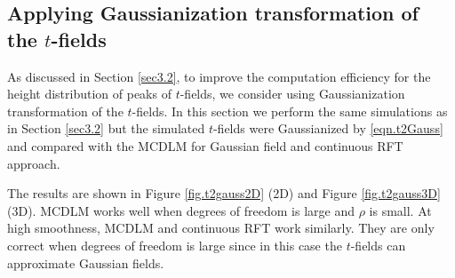 \documentclass{article}
\begin{document}

\subsection{Applying Gaussianization transformation of the $t$-fields}\label{SS:gauss}
As discussed in Section \ref{sec3.2}, to improve the computation efficiency for the height distribution of peaks of $t$-fields, we consider using Gaussianization transformation of the $t$-fields. In this section we perform the same simulations as in Section \ref{sec3.2} but the simulated $t$-fields were Gaussianized by \eqref{eqn.t2Gauss} and compared with the MCDLM for Gaussian field and continuous RFT approach. 

The results are shown in Figure \ref{fig.t2gauss2D} (2D) and Figure \ref{fig.t2gauss3D} (3D). MCDLM works well when degrees of freedom is large and $\rho$ is small. At high smoothness, MCDLM and continuous RFT work similarly. They are only correct when degrees of freedom is large since in this case the $t$-fields can approximate Gaussian fields.
\end{document}
